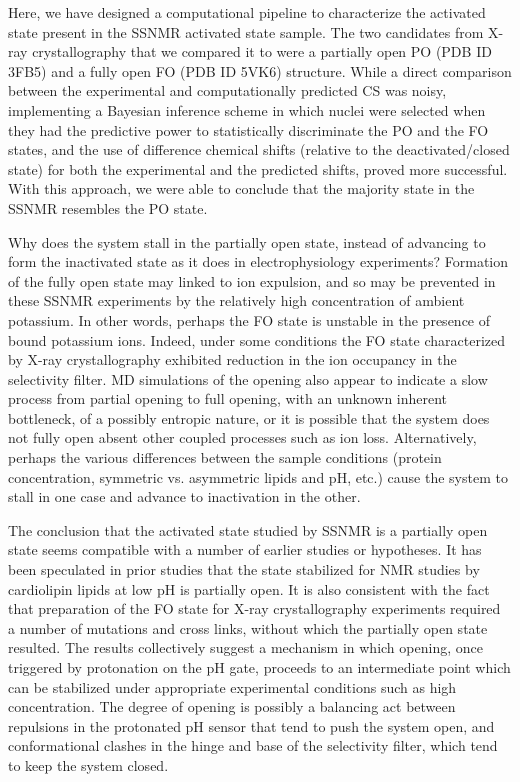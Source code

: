\documentclass[%
 aip,
 amsmath,amssymb,
 preprint,%
]{revtex4-1}
\begin{document}
Here, we have designed a computational pipeline to characterize the activated state present in the SSNMR activated state sample. The two candidates from X-ray crystallography that we compared it to were a partially open PO (PDB ID 3FB5) and a fully open FO (PDB ID 5VK6) structure. While a direct comparison between the experimental and computationally predicted CS was noisy, implementing a Bayesian inference scheme in which nuclei were selected when they had the predictive power to statistically discriminate the PO and the FO states, and the use of difference chemical shifts (relative to the deactivated/closed state) for both the experimental and the predicted shifts, proved more successful. With this approach, we were able to conclude that the majority state in the SSNMR resembles the PO state. 

Why does the system stall in the partially open state, instead of advancing to form the inactivated state as it does in electrophysiology experiments? Formation of the fully open state may linked to ion expulsion, and so may be prevented in these SSNMR experiments by the relatively high concentration of ambient potassium. In other words, perhaps the FO state is unstable in the presence of bound potassium ions.  Indeed, under some conditions the FO state characterized by X-ray crystallography exhibited reduction in the ion occupancy in the selectivity filter.\cite{Cuello2010}  MD simulations of the opening also appear to indicate a slow process from partial opening to full opening,  with an unknown inherent bottleneck, of a possibly entropic nature, or it is possible that the system does not fully open absent other coupled processes such as ion loss. Alternatively, perhaps the various differences between the sample conditions (protein concentration, symmetric vs. asymmetric lipids and pH, etc.) cause the system to stall in one case and advance to inactivation in the other. 

The conclusion that the activated state studied by SSNMR is a partially open state seems compatible with a number of earlier studies or hypotheses. It has been speculated in prior studies that the state stabilized for NMR studies by cardiolipin lipids at low pH is partially open.\cite{VanderCruijsen2017} It is also consistent with the fact that preparation of the FO state for  X-ray crystallography experiments required a number of mutations and cross links, without which the partially open state resulted. The results collectively suggest a mechanism in which opening, once triggered by protonation on the pH gate, proceeds to an intermediate point which can be stabilized under appropriate experimental conditions such as high  concentration.  The degree of opening is possibly a balancing act between repulsions in the protonated pH sensor that tend to push the system open, and conformational clashes in the hinge and base of the selectivity filter, which tend to keep the system closed. 
\end{document}
